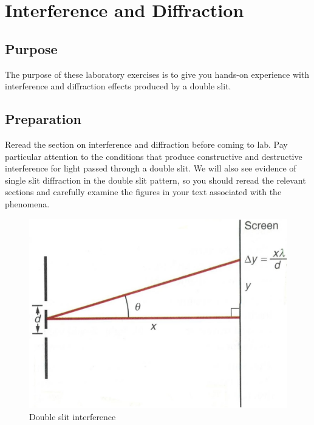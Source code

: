 \chapter{Interference and Diffraction}

\section{Purpose}  The purpose of these laboratory exercises is to give you hands-on experience with interference and diffraction effects produced by a double slit.
\section{Preparation}  Reread the section on interference and diffraction before coming to lab.  Pay particular attention to the conditions that produce constructive and destructive interference for light passed through a double slit.  We will also see evidence of single slit diffraction in the double slit pattern, so you should reread the relevant sections and carefully examine the figures in your text associated with the phenomena.


\begin{figure} %
	\centering
	\includegraphics[scale=0.8]{5bgraf/fig_18}
	\caption{Double slit interference}
	\label{f:fig18}
\end{figure}


